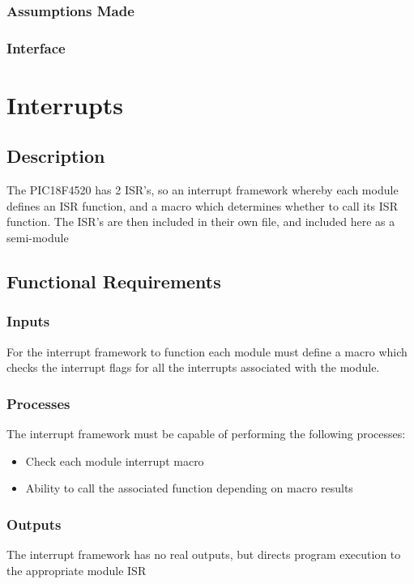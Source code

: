 \documentclass[]{report}
\begin{document}
\subsubsection{Assumptions Made}

\subsubsection{Interface}


\section{Interrupts}
\subsection{Description}
The PIC18F4520 has 2 ISR's, so an interrupt framework whereby each module defines an ISR function, and a macro which determines whether to call its ISR function. The ISR's are then included in their own file, and included here as a semi-module

\subsection{Functional Requirements}
\subsubsection{Inputs}
For the interrupt framework to function each module must define a macro which checks the interrupt flags for all the interrupts associated with the module.

\subsubsection{Processes}
The interrupt framework must be capable of performing the following processes:
\begin{itemize}
	\item Check each module interrupt macro
	\item Ability to call the associated function depending on macro results
\end{itemize}

\subsubsection{Outputs}
The interrupt framework has no real outputs, but directs program execution to the appropriate module ISR
\end{document}
